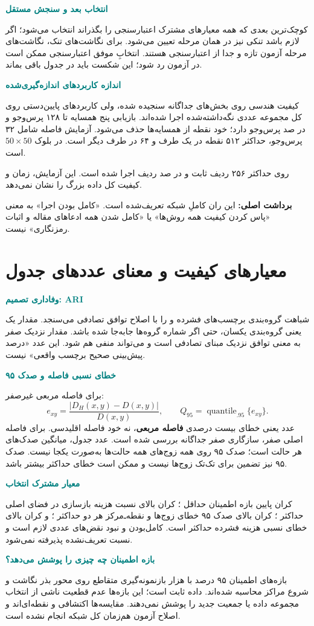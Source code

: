 \documentclass[11pt,a4paper]{article}
\newcommand{\lesson}[1]{\clearpage\section{#1}}
\newcommand{\key}[1]{\par\vspace{4pt}\noindent\colorbox{pale}{\parbox{\dimexpr\textwidth-2\fboxsep\relax}{\textbf{برداشت اصلی:} #1}}\par\vspace{3pt}}
\newcommand{\sub}[1]{\par\vspace{3pt}\textbf{\textcolor{teal}{#1}}\par}
\begin{document}
\sub{انتخاب بعد و سنجش مستقل}
کوچک‌ترین بعدی که همه معیارهای مشترک اعتبارسنجی را بگذراند انتخاب می‌شود؛ اگر لازم باشد تنکی نیز در همان مرحله تعیین می‌شود. برای نگاشت‌های تنک، نگاشت‌های مرحله آزمون تازه و جدا از اعتبارسنجی هستند. انتخابِ موفق اعتبارسنجی ممکن است در آزمون رد شود؛ این شکست باید در جدول باقی بماند.

\sub{اندازه کاربردهای اندازه‌گیری‌شده}
کیفیت هندسی روی بخش‌های جداگانه سنجیده شده، ولی کاربردهای پایین‌دستی روی کل مجموعه عددی نگه‌داشته‌شده اجرا شده‌اند. بازیابی پنج همسایه تا ۱۲۸ پرس‌وجو و در  صد پرس‌وجو دارد؛ خود نقطه از همسایه‌ها حذف می‌شود. آزمایش فاصله شامل ۳۲ پرس‌وجو، حداکثر ۵۱۲ نقطه در یک طرف و ۶۴ در طرف دیگر است. در  بلوک \(50\times50\) است.

 روی حداکثر ۲۵۶ ردیف ثابت و در  صد ردیف اجرا شده است. این آزمایش، زمان و کیفیت  کل داده بزرگ را نشان نمی‌دهد.
\key{این ران کاملِ شبکه تعریف‌شده است. «کامل بودن اجرا» به معنی «پاس کردن کیفیت همه روش‌ها» یا «کامل شدن همه ادعاهای مقاله و اثبات رمزنگاری» نیست.}

\lesson{معیارهای کیفیت و معنای عددهای جدول}
\sub{وفاداری تصمیم: ARI}
 شباهت گروه‌بندی برچسب‌های فشرده و  را با اصلاح توافق تصادفی می‌سنجد. مقدار یک یعنی گروه‌بندی یکسان، حتی اگر شماره گروه‌ها جابه‌جا شده باشد. مقدار نزدیک صفر به معنی توافق نزدیک مبنای تصادفی است و می‌تواند منفی هم شود. این عدد «درصد پیش‌بینی صحیح برچسب واقعی» نیست.

\sub{خطای نسبی فاصله و صدک ۹۵}
برای فاصله مربعی غیرصفر:
\[
 e_{xy}=\frac{|D_H(x,y)-D(x,y)|}{D(x,y)},
 \qquad Q_{95}=\operatorname{quantile}_{.95}\{e_{xy}\}.
\]
عدد  یعنی خطای بیست درصدی \textbf{فاصله مربعی}، نه خود فاصله اقلیدسی. برای فاصله اصلی صفر، سازگاری صفر جداگانه بررسی شده است. عدد جدول، میانگین صدک‌های هر حالت است؛ صدک ۹۵ روی همه زوج‌های همه حالت‌ها به‌صورت یکجا نیست. صدک ۹۵ نیز تضمین برای تک‌تک زوج‌ها نیست و ممکن است خطای حداکثر بیشتر باشد.

\sub{معیار مشترک انتخاب}
کران پایین بازه اطمینان  حداقل ؛ کران بالای نسبت هزینه بازسازی در فضای اصلی حداکثر ؛ کران بالای صدک ۹۵ خطای زوج‌ها و نقطه‌ـ‌مرکز هر دو حداکثر ؛ و کران بالای خطای نسبی هزینه فشرده حداکثر  است. کامل‌بودن و نبود نقض‌های عددی لازم است و نسبت تعریف‌نشده پذیرفته نمی‌شود.

\sub{بازه اطمینان چه چیزی را پوشش می‌دهد؟}
بازه‌های اطمینان ۹۵ درصد با هزار بازنمونه‌گیری متقاطع روی محور بذر نگاشت و شروع مراکز محاسبه شده‌اند. داده ثابت است؛ این بازه‌ها عدم قطعیت ناشی از انتخاب مجموعه داده یا جمعیت جدید را پوشش نمی‌دهند. مقایسه‌ها اکتشافی و نقطه‌ای‌اند و اصلاح آزمون هم‌زمان کل شبکه انجام نشده است.
\end{document}

